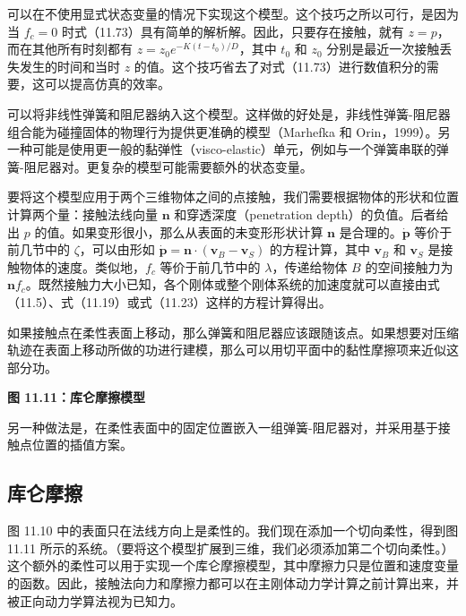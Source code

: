 \documentclass[10pt,a4paper]{book}
\theoremstyle{thmstyle} %
\theoremstyle{defstyle} %
\theoremstyle{prostyle} %
\begin{document}
可以在不使用显式状态变量的情况下实现这个模型。这个技巧之所以可行，是因为当 $f_c = 0$ 时式（11.73）具有简单的解析解。因此，只要存在接触，就有 $z = p$，而在其他所有时刻都有 $z = z_0 e^{-K(t-t_0)/D}$，其中 $t_0$ 和 $z_0$ 分别是最近一次接触丢失发生的时间和当时 $z$ 的值。这个技巧省去了对式（11.73）进行数值积分的需要，这可以提高仿真的效率。



可以将非线性弹簧和阻尼器纳入这个模型。这样做的好处是，非线性弹簧-阻尼器组合能为碰撞固体的物理行为提供更准确的模型（Marhefka 和 Orin，1999）。另一种可能是使用更一般的黏弹性（visco-elastic）单元，例如与一个弹簧串联的弹簧-阻尼器对。更复杂的模型可能需要额外的状态变量。



要将这个模型应用于两个三维物体之间的点接触，我们需要根据物体的形状和位置计算两个量：接触法线向量 $\boldsymbol{n}$ 和穿透深度（penetration depth）的负值。后者给出 $p$ 的值。如果变形很小，那么从表面的未变形形状计算 $\boldsymbol{n}$ 是合理的。$\dot{\boldsymbol{p}}$ 等价于前几节中的 $\zeta$，可以由形如 $\dot{\boldsymbol{p}}=\boldsymbol{n}\cdot(\boldsymbol{v}_{B}-\boldsymbol{v}_{S})$ 的方程计算，其中 $\boldsymbol{v}_{B}$ 和 $\boldsymbol{v}_{S}$ 是接触物体的速度。类似地，$f_{c}$ 等价于前几节中的 $\lambda$，传递给物体 $B$ 的空间接触力为 $\boldsymbol{n}f_{c}$。既然接触力大小已知，各个刚体或整个刚体系统的加速度就可以直接由式（11.5）、式（11.19）或式（11.23）这样的方程计算得出。



如果接触点在柔性表面上移动，那么弹簧和阻尼器应该跟随该点。如果想要对压缩轨迹在表面上移动所做的功进行建模，那么可以用切平面中的黏性摩擦项来近似这部分功。



\noindent\textbf{图 11.11：库仑摩擦模型}





另一种做法是，在柔性表面中的固定位置嵌入一组弹簧-阻尼器对，并采用基于接触点位置的插值方案。



\subsection{库仑摩擦}





图 11.10 中的表面只在法线方向上是柔性的。我们现在添加一个切向柔性，得到图 11.11 所示的系统。（要将这个模型扩展到三维，我们必须添加第二个切向柔性。）这个额外的柔性可以用于实现一个库仑摩擦模型，其中摩擦力只是位置和速度变量的函数。因此，接触法向力和摩擦力都可以在主刚体动力学计算之前计算出来，并被正向动力学算法视为已知力。
\end{document}

